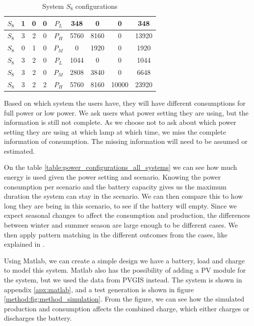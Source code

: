 \begin{table}[h!]
\begin{subtable}{\textwidth}
\begin{tabularx}{\linewidth}{|C|S[table-format=1.0]|S[table-format=1.0]|S[table-format=1.0]|C|S[table-format=4.0]|S[table-format=4.0]|S[table-format=5.0]|c|}
    $S_8$  & 1   & 0   & 0   & $P_L$         & 348        & 0          & 0          & 348             \\ \hline
    $S_8$  & 3   & 2   & 0   & $P_H$         & 5760       & 8160       & 0          & 13920           \\ \hline
    $S_8$  & 0   & 1   & 0   & $P_M$         & 0          & 1920       & 0          & 1920            \\ \hline
    $S_8$  & 3   & 2   & 0   & $P_L$         & 1044       & 0          & 0          & 1044            \\ \hline
    $S_8$  & 3   & 2   & 0   & $P_M$         & 2808       & 3840       & 0          & 6648            \\ \hline
    $S_8$  & 3   & 2   & 2   & $P_H$         & 5760       & 8160       & 10000      & 23920           \\ \hline
    \end{tabularx}
    \caption{System $S_8$ configurations}
    \label{subtable:power_s8}
\end{subtable}
\end{table}

Based on which system the users have, they will have different consumptions for full power or low power. We ask users what power setting they are using, but the information is still not complete. As we choose not to ask about which power setting they are using at which lamp at which time, we miss the complete information of consumption. The missing information will need to be assumed or estimated. 

On the table \ref{table:power_configurations_all_systems} we can see how much energy is used given the power setting and scenario. Knowing the power consumption per scenario and the battery capacity gives us the maximum duration the system can stay in the scenario. We can then compare this to how long they are being in this scenario, to see if the battery will empty. Since we expect seasonal changes to affect the consumption and production, the differences between winter and summer season are large enough to be different cases. We then apply pattern matching in the different outcomes from the cases, like explained in \citep{yinCaseStudyResearch2018}.
\smallskip

Using Matlab, we can create a simple design we have a battery, load and charge to model this system. Matlab also has the possibility of adding a PV module for the system, but we used the data from PVGIS instead. The system is shown in appendix \ref{apx:matlab}, and a test generation is shown in figure \ref{method:fig:method_simulation}. From the figure, we can see how the simulated production and consumption affects the combined charge, which either charges or discharges the battery. 

